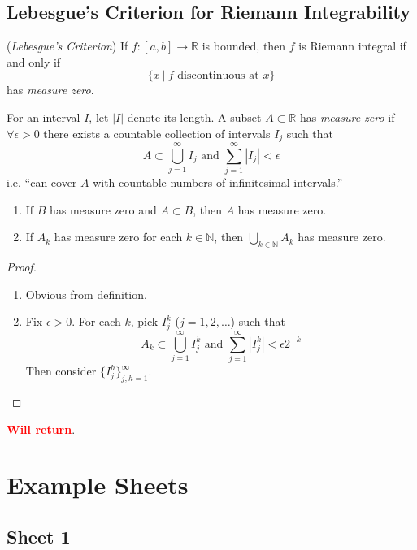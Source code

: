 \documentclass[10pt, a4paper, twoside]{report}
\begin{document}
\subsection{Lebesgue's Criterion for Riemann Integrability}
\begin{theorem}
    (\emph{Lebesgue's Criterion}) If \(f:[a,b]\to\mathbb{R}\) is bounded, then \(f\) is Riemann integral if and only if 
    \[\{x\:|\:f\text{  discontinuous at  }x\}\]
    has \emph{measure zero}.
    \label{thm:lebesgue_criterion}
\end{theorem}
\begin{definition}
    For an interval \(I\), let \(|I|\) denote its length. A subset \(A\subset\mathbb{R}\) has \emph{measure zero} if \(\forall \epsilon>0\) there exists a countable collection of intervals \(I_j\) such that 
    \[A\subset\bigcup_{j=1}^\infty I_j\text{  and  }\sum_{j=1}^{\infty}|I_j|<\epsilon\]
    i.e. ``can cover \(A\) with countable numbers of infinitesimal intervals.''
    \label{def:measure_zero}
\end{definition}
\begin{lemma} \item 
    \begin{enumerate}
        \item If \(B\) has measure zero and \(A\subset B\), then \(A\) has measure zero.
        \item If \(A_k\) has measure zero for each \(k\in\mathbb{N}\), then \(\bigcup_{k\in\mathbb{N}}A_k\) has measure zero.
    \end{enumerate}
\end{lemma}
\begin{proof} \item[]
    \begin{enumerate}
        \item Obvious from definition.
        \item Fix \(\epsilon>0\). For each \(k\), pick \(I_j^k\) (\(j=1,2,\ldots\)) such that 
        \[A_k\subset\bigcup_{j=1}^\infty I_j^k\text{  and  }\sum_{j=1}^{\infty}|I_j^k|<\epsilon 2^{-k}\]
        Then consider \(\{I_j^h\}_{j,h=1}^\infty\). 
    \end{enumerate}
\end{proof}
\textcolor{red}{\textbf{Will return}}.
\newpage
\section{Example Sheets}
\subsection{Sheet 1}
\end{document}

